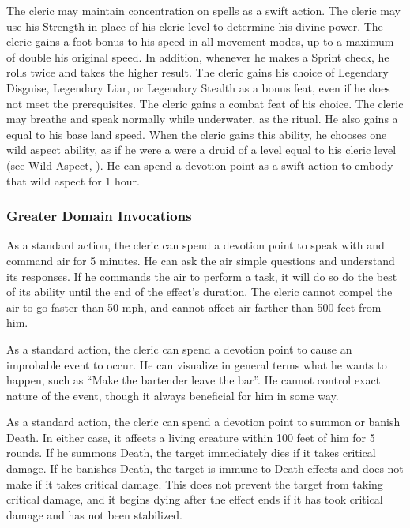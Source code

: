     The cleric may maintain concentration on  spells as a swift action.
    The cleric may use his Strength in place of his cleric level to determine his divine power.
    The cleric gains a  foot bonus to his speed in all movement modes, up to a maximum of double his original speed.
    In addition, whenever he makes a Sprint check, he rolls twice and takes the higher result.
    The cleric gains his choice of Legendary Disguise, Legendary Liar, or Legendary Stealth as a bonus feat, even if he does not meet the prerequisites.
    The cleric gains a combat feat of his choice.
     The cleric may breathe and speak normally while underwater, as the 
    ritual.
    He also gains a  equal to his base land speed.
    When the cleric gains this ability, he chooses one wild aspect ability, as if he were a were a druid of a level equal to his cleric level (see Wild Aspect, ).
    He can spend a devotion point as a swift action to embody that wild aspect for 1 hour.

\subsubsection{Greater Domain Invocations}\label{Greater Domain Invocations}

    As a standard action, the cleric can spend a devotion point to speak with and command air for 5 minutes.
    He can ask the air simple questions and understand its responses.
    If he commands the air to perform a task, it will do so do the best of its ability until the end of the effect's duration.
    The cleric cannot compel the air to go faster than 50 mph, and cannot affect air farther than 500 feet from him.

    As a standard action, the cleric can spend a devotion point to cause an improbable event to occur.
    He can visualize in general terms what he wants to happen, such as ``Make the bartender leave the bar''.
    He cannot control exact nature of the event, though it always beneficial for him in some way.

    As a standard action, the cleric can spend a devotion point to summon or banish Death.
    In either case, it affects a living creature within 100 feet of him for 5 rounds.
    If he summons Death, the target immediately dies if it takes critical damage.
    If he banishes Death, the target is immune to Death effects and does not make  if it takes critical damage.
    This does not prevent the target from taking critical damage, and it begins dying after the effect ends if it has took critical damage and has not been stabilized.

